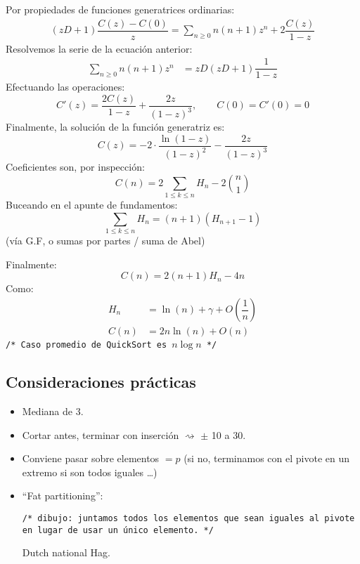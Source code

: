 \documentclass[english, spanish, fleqn, 10pt]{article}
\newcommand{\comillas}[1]{``#1''}
\newcommand{\comentarioc}[1]{\texttt{\textcolor{webred}{/* #1 */}}}
\numberwithin{equation}{section}
\newcommand{\nparentesis}[1]{\left( #1 \right)}
\theoremstyle{definition}
\begin{document}
Por propiedades de funciones generatrices ordinarias:
\begin{align*}
\nparentesis{zD + 1}\dfrac{C\nparentesis{z} - C\nparentesis{0}}{z} = \sum_{n \geq 0} n\nparentesis{n+1} z^n + 2\dfrac{C\nparentesis{z}}{1-z}
\end{align*}
Resolvemos la serie de la ecuación anterior:
\begin{align*}
\sum_{n \geq 0} n\nparentesis{n+1} z^n &= zD \nparentesis{zD + 1} \dfrac{1}{1-z}
\end{align*}
Efectuando las operaciones:
\begin{equation}
C'\nparentesis{z} = \dfrac{2C\nparentesis{z}}{1-z} + \dfrac{2z}{\nparentesis{1-z}^3},\qquad C\nparentesis{0} = C'\nparentesis{0}  = 0
\end{equation}
Finalmente, la solución de la función generatriz es:
\begin{equation}
C\nparentesis{z} = -2\cdot  \dfrac{\ln \nparentesis{1-z}}{\nparentesis{1-z}^2} - \dfrac{2z}{\nparentesis{1-z} ^3}
\end{equation}
Coeficientes son, por inspección:
\begin{equation*}
C\nparentesis{n} = 2 \sum_{1 \leq k \leq n} H_n - 2 \binom{n}{1}
\end{equation*}
Buceando en el apunte de fundamentos:
\begin{equation*}
\sum_{1 \leq k \leq n} H_n = \nparentesis{n+1} \nparentesis{H_{n+1} - 1}
\end{equation*}
(vía G.F, o sumas por partes / suma de Abel)

Finalmente:
\begin{equation}
C\nparentesis{n} = 2\nparentesis{n + 1} H _n  - 4n
\end{equation}
Como:
\begin{align*}
H_n &= \ln\nparentesis{n} + \gamma + O \nparentesis{\dfrac{1}{n}}\\
C\nparentesis{n} &= 2n \ln \nparentesis{n} + O\nparentesis{n}
\end{align*}
\comentarioc{Caso promedio de QuickSort es $n\log n$}

\subsection{Consideraciones prácticas}
\begin{itemize}
	\item Mediana de 3.
	\item Cortar antes, terminar con inserción $\rightsquigarrow$ $\pm$ 10 a 30.
	\item Conviene pasar sobre elementos $=p$ (si no, terminamos con el pivote en un extremo si son todos iguales \ldots )
	
	\item \comillas{Fat partitioning}:
	\begin{center}
		\comentarioc{dibujo: juntamos todos los elementos que sean iguales al pivote en lugar de usar un único elemento.}		
	\end{center}
	Dutch national Hag.
\end{itemize}
\end{document}
